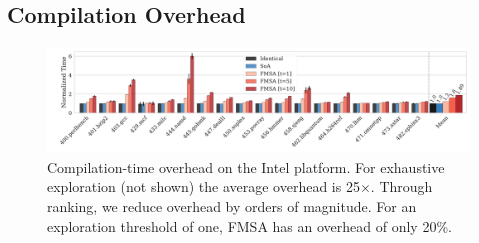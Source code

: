 



\subsection{Compilation Overhead}

\begin{figure}[t]
  \centering
  \includegraphics[width=\linewidth]{figs/compilation-time.pdf}
  \vspace{-4ex}
	\caption{Compilation-time overhead on the Intel platform. For exhaustive exploration (not shown) the average overhead is 25$\times$. Through ranking, we reduce overhead by orders of magnitude. For an exploration threshold of one, FMSA has an overhead of only 20\%.}
  \label{fig:compilation-time}
\end{figure}


